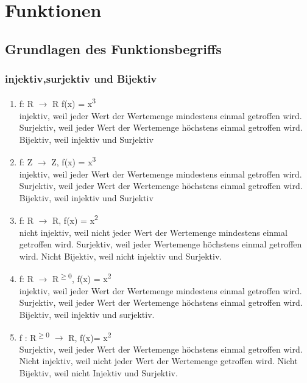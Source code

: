 \chapter{Funktionen}
\section{Grundlagen des Funktionsbegriffs}
\subsection{injektiv,surjektiv und Bijektiv}
\begin{enumerate}
    \item f: R $\to$ R f(x) = x\textsuperscript{3}\\
    {
        \tiny
        injektiv, weil jeder Wert der Wertemenge mindestens einmal
        getroffen wird. Surjektiv, weil jeder Wert der Wertemenge
        höchstens einmal getroffen wird. Bijektiv, weil injektiv
        und Surjektiv
    }
    \item f: Z $\to$ Z, f(x) = x\textsuperscript{3}\\
    {
        \tiny
        injektiv, weil jeder Wert der Wertemenge mindestens einmal
        getroffen wird. Surjektiv, weil jeder Wert der Wertemenge
        höchstens einmal getroffen wird. Bijektiv, weil injektiv
        und Surjektiv
    }
    \item f: R $\to$ R, f(x) = x\textsuperscript{2}\\
    {
        \tiny
        nicht injektiv, weil nicht jeder Wert der Wertemenge mindestens
        einmal getroffen wird. Surjektiv, weil jeder Wertemenge höchstens
        einmal getroffen wird. Nicht Bijektiv, weil nicht injektiv und
        Surjektiv.
    }
    \item f: R $\to$ R\textsuperscript{$\geq$0}, f(x) = x\textsuperscript{2}\\
    {
        \tiny
        injektiv, weil jeder Wert der Wertemenge mindestens einmal getroffen
        wird. Surjektiv, weil jeder Wert der Wertemenge höchstens einmal
        getroffen wird. Bijektiv, weil injektiv und surjektiv.
    }
    \item f : R\textsuperscript{$\geq$0} $\to$ R, f(x)= x\textsuperscript{2}\\
    {
        \tiny
        Surjektiv, weil jeder Wert der Wertemenge höchstens einmal getroffen
        wird. Nicht injektiv, weil nicht jeder Wert der Wertemenge getroffen
        wird. Nicht Bijektiv, weil nicht Injektiv und Surjektiv.
    }

\end{enumerate}
